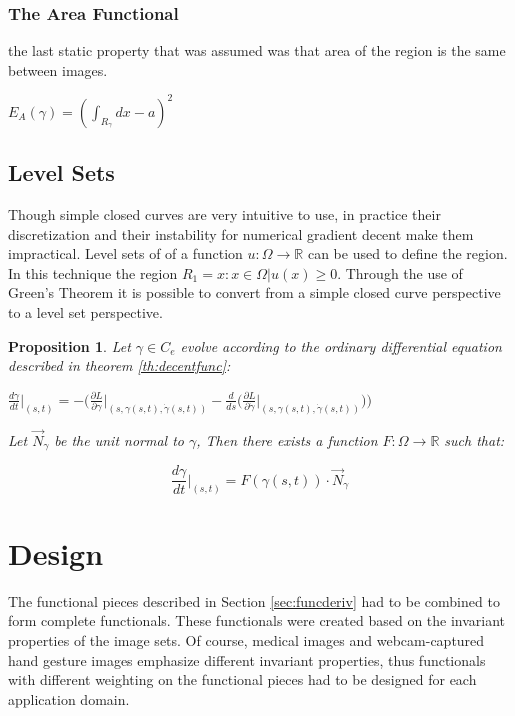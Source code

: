 \documentclass{article}
\newcommand{\R}{\mathds{R}}
\newtheorem{prop}{Proposition}
\begin{document}
			\subsubsection{The Area Functional}
				the last static property that was assumed was that area of the region is the same between images.
				\begin{center}
					$E_{A}(\gamma) = (\int_{R_\gamma}{dx} - a)^2$
				\end{center}

		\subsection{Level Sets}
			Though simple closed curves are  very intuitive to use, in practice their discretization and their instability for numerical gradient decent make them impractical. Level sets of of a function $u:\Omega\rightarrow\R$ can be used to define the region. In this technique the region $R_1 = {x: x\in\Omega|u(x)\geq0}$. Through the use of Green's Theorem it is possible to convert from a simple closed curve perspective to a level set perspective.

			\begin{prop}\label{pr:curvtofn}
				Let $\gamma\in C_e$ evolve according to the ordinary differential equation described in theorem \ref{th:decentfunc}:
				\begin{center}
					$\frac{d\gamma}{dt}\biggr\rvert_{(s,t)} = - \Bigg(\frac{\partial L}{\partial \gamma}\biggr\rvert_{(s,\gamma(s,t),\dot\gamma(s,t))} - \frac{d}{ds}\bigg(\frac{\partial L}{\partial \dot\gamma}\biggr\rvert_{(s,\gamma(s,t),\dot\gamma(s,t))}\bigg)\Bigg)$
				\end{center}
				Let $\vec N_\gamma$ be the unit normal to $\gamma$, Then there exists a function $F : \Omega \rightarrow \R$ such that:

				\begin{equation}\label{eq:greenscurv}
					\frac{d\gamma}{dt}\biggr\rvert_{(s,t)} = F(\gamma(s,t))\cdot \vec N_\gamma
				\end{equation}

			\end{prop}



	\section{Design}
	The functional pieces described in Section \ref{sec:funcderiv} had to be combined to form complete functionals. These functionals were created based on the invariant properties of the image sets. Of course, medical images and webcam-captured hand gesture images emphasize different invariant properties, thus functionals with different weighting on the functional pieces had to be designed for each application domain.
\end{document}
